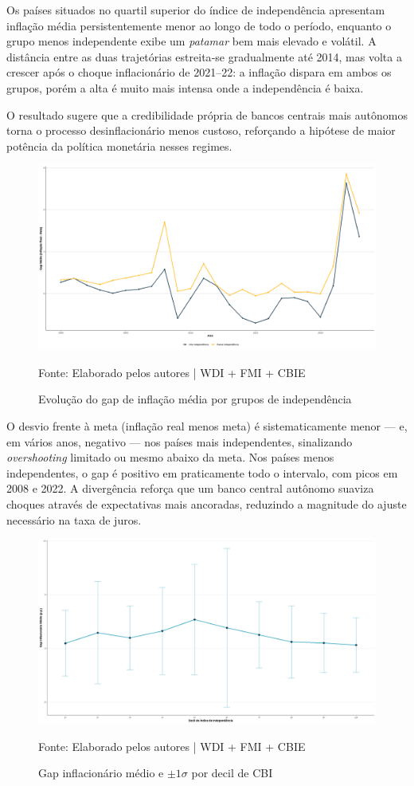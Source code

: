 \documentclass[a4paper,12pt]{article}
\begin{document}
Os países situados no quartil superior do índice de independência apresentam inflação média persistentemente menor ao longo de todo o período, enquanto o grupo menos independente exibe um \textit{patamar} bem mais elevado e volátil.  
A distância entre as duas trajetórias estreita‑se gradualmente até 2014, mas volta a crescer após o choque inflacionário de 2021–22: a inflação dispara em ambos os grupos, porém a alta é muito mais intensa onde a independência é baixa.  

O resultado sugere que a credibilidade própria de bancos centrais mais autônomos torna o processo desinflacionário menos custoso, reforçando a hipótese de maior potência da política monetária nesses regimes.

\begin{figure}[H]
    \centering
    \caption{Evolução do gap de inflação média por grupos de independência}
    \includegraphics[width=.85\linewidth]{Imagens/paperi10.png}
    \label{fig:gap_media}

    \footnotesize{Fonte: Elaborado pelos autores | WDI + FMI + CBIE}
\end{figure}

O desvio frente à meta (inflação real menos meta) é sistematicamente menor — e, em vários anos, negativo — nos países mais independentes, sinalizando \textit{overshooting} limitado ou mesmo abaixo da meta.  
Nos países menos independentes, o gap é positivo em praticamente todo o intervalo, com picos em 2008 e 2022.  
A divergência reforça que um banco central autônomo suaviza choques através de expectativas mais ancoradas, reduzindo a magnitude do ajuste necessário na taxa de juros.

\begin{figure}[H]
    \centering
    \caption{Gap inflacionário médio e \(\pm1\sigma\) por decil de CBI}
    \includegraphics[width=.85\linewidth]{Imagens/paperi7.png}
    \label{fig:decil_gap}

    \footnotesize{Fonte: Elaborado pelos autores | WDI + FMI + CBIE}
\end{figure}
\end{document}
